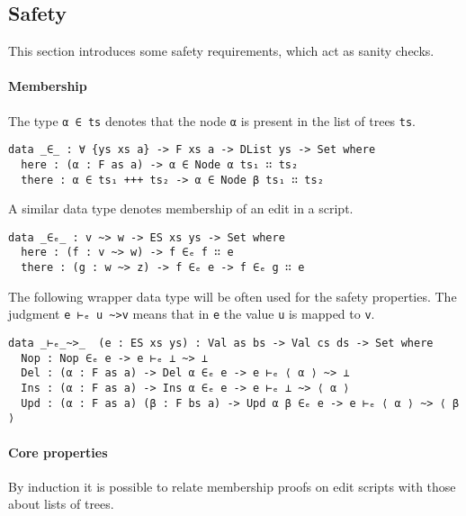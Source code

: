 \documentclass[../Thesis.tex]{subfiles}
\begin{document}
	\subsection{Safety}
	\label{subsec:Safety}
	This section introduces some safety requirements, which act as sanity
	checks. 

	\paragraph{Membership}
	\label{par:membership}
	The type \texttt{α ∈ ts} denotes that the node \texttt{α} is present
	in the list of trees \texttt{ts}.

\begin{verbatim}
data _∈_ : ∀ {ys xs a} -> F xs a -> DList ys -> Set where
  here : (α : F as a) -> α ∈ Node α ts₁ ∷ ts₂
  there : α ∈ ts₁ +++ ts₂ -> α ∈ Node β ts₁ ∷ ts₂
\end{verbatim}

A similar data type denotes membership of an edit in a script.

\begin{verbatim}
data _∈ₑ_ : v ~> w -> ES xs ys -> Set where
  here : (f : v ~> w) -> f ∈ₑ f ∷ e
  there : (g : w ~> z) -> f ∈ₑ e -> f ∈ₑ g ∷ e
\end{verbatim}
	
	The following wrapper data type will be often used for the 
	safety properties.
	The judgment \texttt{e ⊢ₑ u \textasciitilde>v} means that in 
	\texttt{e} the value \texttt{u} is mapped to \texttt{v}. 

\begin{verbatim}
data _⊢ₑ_~>_  (e : ES xs ys) : Val as bs -> Val cs ds -> Set where
  Nop : Nop ∈ₑ e -> e ⊢ₑ ⊥ ~> ⊥
  Del : (α : F as a) -> Del α ∈ₑ e -> e ⊢ₑ ⟨ α ⟩ ~> ⊥
  Ins : (α : F as a) -> Ins α ∈ₑ e -> e ⊢ₑ ⊥ ~> ⟨ α ⟩
  Upd : (α : F as a) (β : F bs a) -> Upd α β ∈ₑ e -> e ⊢ₑ ⟨ α ⟩ ~> ⟨ β ⟩ 
\end{verbatim}

	
	
	\paragraph{Core properties}
	By induction it is possible to relate membership proofs on edit scripts
	with those about lists of trees.
	
\end{document}

